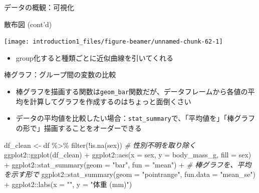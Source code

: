 \documentclass[
  ignorenonframetext,
]{beamer}
\newenvironment{Shaded}{\begin{snugshade}}{\end{snugshade}}
\newcommand{\AttributeTok}[1]{\textcolor[rgb]{0.77,0.63,0.00}{#1}}
\newcommand{\CommentTok}[1]{\textcolor[rgb]{0.56,0.35,0.01}{\textit{#1}}}
\newcommand{\FunctionTok}[1]{\textcolor[rgb]{0.00,0.00,0.00}{#1}}
\newcommand{\NormalTok}[1]{#1}
\newcommand{\OtherTok}[1]{\textcolor[rgb]{0.56,0.35,0.01}{#1}}
\newcommand{\SpecialCharTok}[1]{\textcolor[rgb]{0.00,0.00,0.00}{#1}}
\newcommand{\StringTok}[1]{\textcolor[rgb]{0.31,0.60,0.02}{#1}}
\providecommand{\tightlist}{%
  \setlength{\itemsep}{0pt}\setlength{\parskip}{0pt}}
\begin{document}
\begin{frame}[fragile]{データの概観：可視化}
\begin{block}{散布図 (cont'd)}
\begin{center}\texttt{[image: introduction1\_files/figure-beamer/unnamed-chunk-62-1]} \end{center}

\begin{itemize}
\tightlist
\item
  group化すると種類ごとに近似曲線を引いてくれる
\end{itemize}
\end{block}

\begin{block}{棒グラフ：グループ間の変数の比較}
\protect\hypertarget{ux68d2ux30b0ux30e9ux30d5ux30b0ux30ebux30fcux30d7ux9593ux306eux5909ux6570ux306eux6bd4ux8f03}{}
\begin{itemize}
\tightlist
\item
  棒グラフを描画する関数は\texttt{geom\_bar}関数だが、データフレームから各値の平均を計算してグラフを作成するのはちょっと面倒くさい
\item
  データの平均値を比較したい場合：\texttt{stat\_summary}で、「平均値を」「棒グラフの形で」描画することをオーダーできる
\end{itemize}

\begin{Shaded}
\begin{Highlighting}[]
\NormalTok{df\_clean }\OtherTok{\textless{}{-}}\NormalTok{ df }\SpecialCharTok{\%\textgreater{}\%}
  \FunctionTok{filter}\NormalTok{(}\SpecialCharTok{!}\FunctionTok{is.na}\NormalTok{(sex)) }\CommentTok{\# 性別不明を取り除く}
\NormalTok{ggplot2}\SpecialCharTok{::}\FunctionTok{ggplot}\NormalTok{(df\_clean) }\SpecialCharTok{+}
\NormalTok{  ggplot2}\SpecialCharTok{::}\FunctionTok{aes}\NormalTok{(}\AttributeTok{x =}\NormalTok{ sex, }\AttributeTok{y =}\NormalTok{ body\_mass\_g, }\AttributeTok{fill =}\NormalTok{ sex) }\SpecialCharTok{+}
\NormalTok{  ggplot2}\SpecialCharTok{::}\FunctionTok{stat\_summary}\NormalTok{(}\AttributeTok{geom =} \StringTok{"bar"}\NormalTok{, }\AttributeTok{fun =} \StringTok{"mean"}\NormalTok{) }\SpecialCharTok{+} \CommentTok{\# 棒グラフを、平均を示す形で}
\NormalTok{  ggplot2}\SpecialCharTok{::}\FunctionTok{stat\_summary}\NormalTok{(}\AttributeTok{geom =} \StringTok{"pointrange"}\NormalTok{, }\AttributeTok{fun.data =} \StringTok{"mean\_se"}\NormalTok{) }\SpecialCharTok{+}
\NormalTok{  ggplot2}\SpecialCharTok{::}\FunctionTok{labs}\NormalTok{(}\AttributeTok{x =} \StringTok{""}\NormalTok{, }\AttributeTok{y =} \StringTok{"体重 (mm)"}\NormalTok{)}
\end{Highlighting}
\end{Shaded}


\end{block}
\end{frame}
\end{document}
